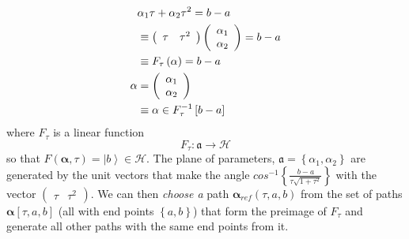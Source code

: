 \documentclass[aps,preprint]{revtex4}
\begin{document}
\begin{align}
& \alpha _{1}\tau +\alpha _{2}\tau ^{2}=b-a  \notag \\
& \equiv \left(
\begin{array}{cc}
\tau & \tau ^{2}%
\end{array}%
\right) \left(
\begin{array}{c}
\alpha _{1} \\
\alpha _{2}%
\end{array}%
\right) =b-a  \notag \\
& \equiv F_{\tau }\left( \mathbf{\alpha }\right) =b-a  \notag \\
\mathbf{\alpha }& =\left(
\begin{array}{c}
\alpha _{1} \\
\alpha _{2}%
\end{array}%
\right)  \notag \\
& \equiv \mathbf{\alpha }\in F_{\tau }^{-1}\left[ b-a\right]
\end{align}%
where $F_{\tau }$ is a linear function
\begin{equation}
F_{\tau }:\mathfrak{a}\rightarrow \mathcal{H}
\end{equation}%
so that $F\left( \mathbf{\alpha },\tau \right) =\left\vert b\right\rangle
\in \mathcal{H}$. The plane of parameters, $\mathfrak{a}=\left\{ \alpha
_{1},\alpha _{2}\right\} $ are generated by the unit vectors that make the
angle $cos^{-1}\left\{ \frac{b-a}{\tau \sqrt{1+\tau ^{2}}}\right\} $ with
the vector $\left(
\begin{array}{cc}
\tau & \tau ^{2}%
\end{array}%
\right) $. We can then \emph{choose a} path $\mathbf{\alpha }_{ref}\left(
\tau ,a,b\right) $ from the set of paths $\mathbf{\alpha }\left[ \tau ,a,b%
\right] $ (all with end points $\left\{ a,b\right\} $) that form the
preimage of $F_{\tau }$ and generate all other paths with the same end
points from it.
\end{document}
